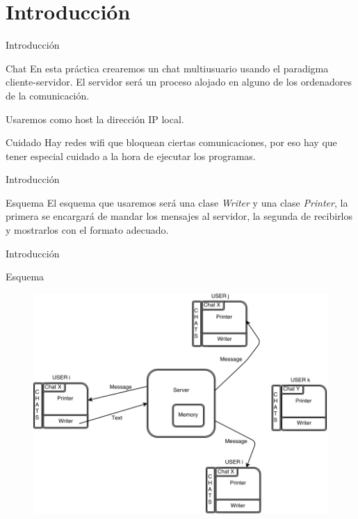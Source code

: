 \section{Introducción}
\begin{frame}{Introducción}
	\begin{block}{Chat}
		En esta práctica crearemos un chat multiusuario usando el paradigma cliente-servidor. El servidor será
		un proceso alojado en alguno de los ordenadores de la comunicación.

		Usaremos como host la dirección IP local.
	\end{block}
	\begin{alertblock}{Cuidado}
		Hay redes wifi que bloquean ciertas comunicaciones, por eso
		hay que tener especial cuidado a la hora de ejecutar los programas.
	\end{alertblock}
\end{frame}




\begin{frame}{Introducción}
	\begin{block}{Esquema}
		El esquema que usaremos será una clase \textit{Writer} y una clase \textit{Printer}, la primera se encargará de mandar los mensajes al servidor, la segunda de recibirlos y mostrarlos con el formato adecuado.
	\end{block}
\end{frame}




\begin{frame}{Introducción}
	\begin{exampleblock}{Esquema}
		\begin{figure}[H]
    		\includegraphics[scale=0.31]{./Imagenes/chat.png}
		\end{figure}
	\end{exampleblock}
\end{frame}
